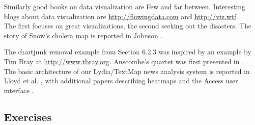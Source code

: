 \documentclass[10pt]{article}
\begin{document}
Similarly good books on data visualization are Few \citep{Few09} and far between. Interesting blogs about data visualization are \url{http://flowingdata.com} and \url{http://viz.wtf}. The first focuses on great visualizations, the second seeking out the disasters. The story of Snow's cholera map is reported in Johnson \citep{Joh07}.

The chartjunk removal example from Section 6.2.3 was inspired by an example by Tim Bray at \url{http://www.tbray.org}. Anscombe's quartet was first presented in \citep{Ans73}. The basic architecture of our Lydia/TextMap news analysis system is reported in Lloyd et al. \citep{LKS05}, with additional papers describing heatmaps \citep{MBL06} and the Access user interface \citep{BWPS10}.

\subsection{Exercises}
\end{document}
